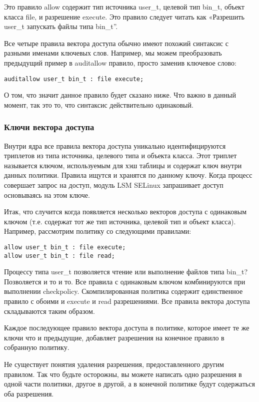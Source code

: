 \documentclass{./../class/UIR}
\begin{document}
Это правило allow содержит тип источника user\_t, целевой тип bin\_t, объект
класса file, и разрешение execute. Это правило следует читать как «Разрешить
user\_t запускать файлы типа bin\_t”.

Все четыре правила вектора доступа обычно имеют похожий синтаксис с разными
именами ключевых слов. Например, мы можем преобразовать предыдущий пример в
auditallow правило, просто заменив ключевое слово:

\begin{verbatim}
auditallow user_t bin_t : file execute;
\end{verbatim}

О том, что значит данное правило будет сказано ниже. Что важно в данный момент,
так  это то, что синтаксис действительно одинаковый.
    
\subsubsection{Ключи вектора доступа}

Внутри ядра все правила вектора доступа уникально идентифицируются триплетов из
типа источника, целевого типа и объекта класса. Этот триплет называется ключом,
используемым для хэш таблицы и содержат ключ внутри данных политики. Правила
ищутся и хранятся по данному ключу. Когда процесс совершает запрос на доступ,
модуль LSM SELinux запрашивает доступ основываясь на этом ключе.

Итак, что случится когда появляется несколько векторов доступа с одинаковым
ключом (т.е. содержат тот же тип источника, целевой тип и объект класса).
Например, рассмотрим политику со следующими правилами:
    
\begin{verbatim}
allow user_t bin_t : file execute;
allow user_t bin_t : file read;
\end{verbatim}    

Процессу типа user\_t позволяется чтение или выполнение файлов типа bin\_t?
Позволяется и то и то. Все правила с одинаковым ключом комбинируются при
выполнении checkpolicy. Скомпилированная политика содержит единственное правило
с обоими и execute и read разрешениями. Все правила вектора доступа складываются
таким образом.

Каждое последующее правило вектора доступа в политике, которое имеет те же ключи
что и предыдущие, добавляет разрешения на конечное правило в собранную политику.

Не существует понятия удаления разрешения, предоставленного другим правилом. Так
что будьте осторожны, вы можете написать одно разрешения в одной части политики,
другое в другой, а в конечной политике будут содержаться оба разрешения.
\end{document}
